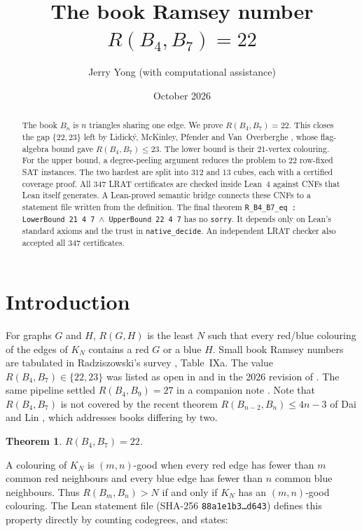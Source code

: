 \documentclass[11pt]{amsart}
\title[$R(B_4,B_7)=22$]{The book Ramsey number $R(B_4,B_7)=22$}
\author{Jerry Yong (with computational assistance)}
\date{October 2026}
\newtheorem{theorem}{Theorem}[section]
\theoremstyle{definition}
\begin{document}
\begin{abstract}
The book $B_n$ is $n$ triangles sharing one edge. We prove
$R(B_4,B_7)=22$. This closes the gap $\{22,23\}$ left by Lidick\'y,
McKinley, Pfender and Van~Overberghe \cite{LMPV}, whose flag-algebra
bound gave $R(B_4,B_7)\le 23$. The lower bound is their $21$-vertex
colouring. For the upper bound, a degree-peeling argument reduces the
problem to $22$ row-fixed SAT instances. The two hardest are split
into $312$ and $13$ cubes, each with a certified coverage proof. All
$347$ LRAT certificates are checked inside Lean~4 against CNFs that
Lean itself generates. A Lean-proved semantic bridge connects these
CNFs to a statement file written from the definition. The final
theorem \texttt{R\_B4\_B7\_eq : LowerBound 21 4 7 $\wedge$ UpperBound
22 4 7} has no \texttt{sorry}. It depends only on Lean's standard
axioms and the trust in \texttt{native\_decide}. An independent LRAT
checker also accepted all $347$ certificates.
\end{abstract}

\maketitle

\section{Introduction}

For graphs $G$ and $H$, $R(G,H)$ is the least $N$ such that every
red/blue colouring of the edges of $K_N$ contains a red $G$ or a blue
$H$. Small book Ramsey numbers are tabulated in Radziszowski's survey
\cite{Rad}, Table~IXa. The value $R(B_4,B_7)\in\{22,23\}$ was listed
as open in \cite{LMPV} and in the 2026 revision of \cite{Rad}. The
same pipeline settled $R(B_4,B_9)=27$ in a companion note \cite{B49}.
Note that $R(B_4,B_7)$ is not covered by the recent theorem
$R(B_{n-2},B_n)\le 4n-3$ of Dai and Lin \cite{DL26}, which addresses
books differing by two.

\begin{theorem}
$R(B_4,B_7)=22$.
\end{theorem}

A colouring of $K_N$ is $(m,n)$-good when every red edge has fewer
than $m$ common red neighbours and every blue edge has fewer than $n$
common blue neighbours. Thus $R(B_m,B_n)>N$ if and only if $K_N$ has
an $(m,n)$-good colouring. The Lean statement file (SHA-256
\texttt{88a1e1b3\dots d643}) defines this property directly by
counting codegrees, and states:
\end{document}
